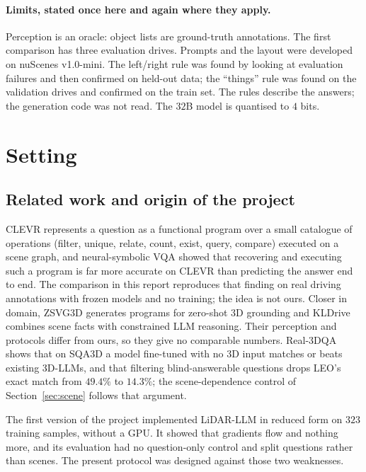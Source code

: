 \documentclass[11pt,a4paper]{article}
\begin{document}
\paragraph{Limits, stated once here and again where they apply.} Perception
is an oracle: object lists are ground-truth annotations. The first comparison
has three evaluation drives. Prompts and the layout were developed on
nuScenes v1.0-mini. The left/right rule was found by looking at evaluation
failures and then confirmed on held-out data; the ``things'' rule was found
on the validation drives and confirmed on the train set. The rules describe
the answers; the generation code was not read. The $32$B model is quantised
to $4$ bits.

\section{Setting}
\label{sec:method}

\subsection{Related work and origin of the project}
\label{sec:related}

CLEVR \cite{clevr} represents a question as a functional program over a small
catalogue of operations (filter, unique, relate, count, exist, query,
compare) executed on a scene graph, and neural-symbolic VQA \cite{nsvqa}
showed that recovering and executing such a program is far more accurate on
CLEVR than predicting the answer end to end. The comparison in this report
reproduces that finding on real driving annotations with frozen models and no
training; the idea is not ours. Closer in domain, ZSVG3D \cite{zsvg3d}
generates programs for zero-shot 3D grounding and KLDrive \cite{kldrive}
combines scene facts with constrained LLM reasoning. Their perception and protocols differ from ours, so they give
no comparable numbers. Real-3DQA \cite{real3dqa} shows that on
SQA3D a model fine-tuned with no 3D input matches or beats existing 3D-LLMs,
and that filtering blind-answerable questions drops LEO's exact match from
$49.4\%$ to $14.3\%$; the scene-dependence control of Section~\ref{sec:scene}
follows that argument.

The first version of the project implemented LiDAR-LLM \cite{lidarllm} in
reduced form on $323$ training samples, without a GPU. It showed that
gradients flow and nothing more, and its evaluation had no question-only
control and split questions rather than scenes. The present protocol was
designed against those two weaknesses.
\end{document}
